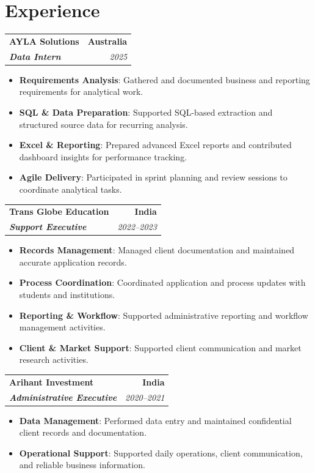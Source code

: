 \documentclass[letterpaper,11pt]{article}
\makeatletter
\newcommand{\resumeItem}[2]{
  \item\small{\textbf{#1}: #2\vspace{-2pt}}
}
\newcommand{\experienceHeading}[4]{
  \vspace{1pt}\noindent
  \begin{tabular*}{\textwidth}{l@{\extracolsep{\fill}}r}
    \textbf{#1} & \textbf{#2} \\
    \textbf{\textit{#3}} & \textit{\small #4} \\
  \end{tabular*}\vspace{-4pt}
}
\newcommand{\experienceItemListStart}{\begin{itemize}[leftmargin=1.15em,topsep=1pt,itemsep=0pt,parsep=0pt,partopsep=0pt]}
\newcommand{\experienceItemListEnd}{\end{itemize}\vspace{2pt}}
\makeatother
\begin{document}
\section{Experience}
\experienceHeading{AYLA Solutions}{Australia}{Data Intern}{2025}
\experienceItemListStart
  \resumeItem{Requirements Analysis}{Gathered and documented business and reporting requirements for analytical work.}
  \resumeItem{SQL \& Data Preparation}{Supported SQL-based extraction and structured source data for recurring analysis.}
  \resumeItem{Excel \& Reporting}{Prepared advanced Excel reports and contributed dashboard insights for performance tracking.}
  \resumeItem{Agile Delivery}{Participated in sprint planning and review sessions to coordinate analytical tasks.}
\experienceItemListEnd

\experienceHeading{Trans Globe Education}{India}{Support Executive}{2022--2023}
\experienceItemListStart
  \resumeItem{Records Management}{Managed client documentation and maintained accurate application records.}
  \resumeItem{Process Coordination}{Coordinated application and process updates with students and institutions.}
  \resumeItem{Reporting \& Workflow}{Supported administrative reporting and workflow management activities.}
  \resumeItem{Client \& Market Support}{Supported client communication and market research activities.}
\experienceItemListEnd

\experienceHeading{Arihant Investment}{India}{Administrative Executive}{2020--2021}
\experienceItemListStart
  \resumeItem{Data Management}{Performed data entry and maintained confidential client records and documentation.}
  \resumeItem{Operational Support}{Supported daily operations, client communication, and reliable business information.}
\experienceItemListEnd
\end{document}
